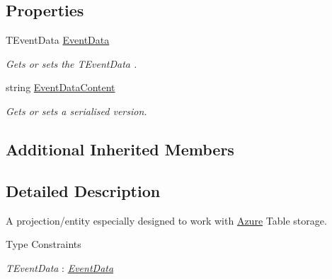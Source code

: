 \subsection*{Properties}
\begin{DoxyCompactItemize}
\item 
T\+Event\+Data \hyperlink{classCqrs_1_1Azure_1_1BlobStorage_1_1EventDataTableEntity_a906bcb5198f91069413fc1d8e848866a_a906bcb5198f91069413fc1d8e848866a}{Event\+Data}
\begin{DoxyCompactList}\small\item\em Gets or sets the {\itshape T\+Event\+Data} . \end{DoxyCompactList}\item 
string \hyperlink{classCqrs_1_1Azure_1_1BlobStorage_1_1EventDataTableEntity_a96b0a7c91d33d469e047c6bd5089d8de_a96b0a7c91d33d469e047c6bd5089d8de}{Event\+Data\+Content}
\begin{DoxyCompactList}\small\item\em Gets or sets a serialised version. \end{DoxyCompactList}\end{DoxyCompactItemize}
\subsection*{Additional Inherited Members}


\subsection{Detailed Description}
A projection/entity especially designed to work with \hyperlink{namespaceCqrs_1_1Azure}{Azure} Table storage. 

\begin{Desc}
\item[Type Constraints]\begin{description}
\item[{\em T\+Event\+Data} : {\em \hyperlink{classCqrs_1_1Azure_1_1BlobStorage_1_1EventDataTableEntity_a906bcb5198f91069413fc1d8e848866a_a906bcb5198f91069413fc1d8e848866a}{Event\+Data}}]\end{description}
\end{Desc}


